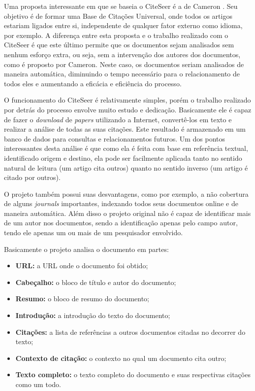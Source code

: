 Uma proposta interessante em que se baseia o CiteSeer é a de Cameron \cite{cameron}. Seu objetivo é de formar uma Base de Citações Universal, onde todos os artigos estariam ligados entre si, independente de qualquer fator externo como idioma, por exemplo. A diferença entre esta proposta e o trabalho realizado com o CiteSeer é que este último permite que os documentos sejam analisados sem nenhum esforço extra, ou seja, sem a intervenção dos autores dos documentos, como é proposto por Cameron. Neste caso, os documentos seriam analisados de maneira automática, diminuindo o tempo necessário para o relacionamento de todos eles e aumentando a eficácia e eficiência do processo.

O funcionamento do CiteSeer é relativamente simples, porém o trabalho realizado por detrás do processo envolve muito estudo e dedicação. Basicamente ele é capaz de fazer o \textit{download} de \textit{papers} utilizando a Internet, convertê-los em texto e realizar a análise de todas as suas citações. Este resultado é armazenado em um banco de dados para consultas e relacionamentos futuros. Um dos pontos interessantes desta análise é que como ela é feita com base em referência textual, identificado origem e destino, ela pode ser facilmente aplicada tanto no sentido natural de leitura (um artigo cita outros) quanto no sentido inverso (um artigo é citado por outros). 

O projeto também possui suas desvantagens, como por exemplo, a não cobertura de alguns \textit{journals} importantes, indexando todos seus documentos online e de maneira automática. Além disso o projeto original não é capaz de identificar mais de um autor nos documentos, sendo a identificação apenas pelo campo autor, tendo ele apenas um ou mais de um pesquisador envolvido.

Basicamente o projeto analisa o documento em partes:

\begin{itemize}
\item \textbf{URL:} a URL onde o documento foi obtido;
\item \textbf{Cabeçalho:} o bloco de título e autor do documento;
\item \textbf{Resumo:} o bloco de resumo do documento;
\item \textbf{Introdução:} a introdução do texto do documento;
\item \textbf{Citações:} a lista de referências a outros documentos citadas no decorrer do texto;
\item \textbf{Contexto de citação:} o contexto no qual um documento cita outro;
\item \textbf{Texto completo:} o texto completo do documento e suas respectivas citações como um todo.
\end{itemize}

